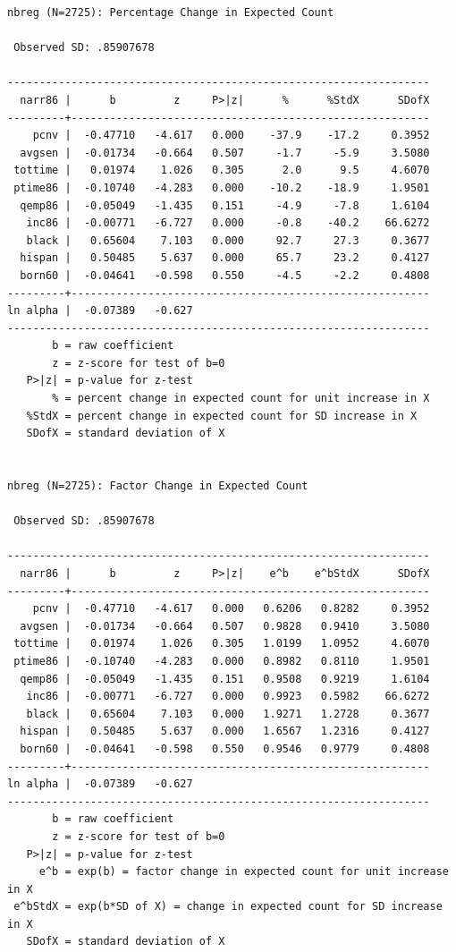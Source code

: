 \documentclass[
]{book}
\begin{document}
\begin{verbatim}
nbreg (N=2725): Percentage Change in Expected Count 

 Observed SD: .85907678

------------------------------------------------------------------
  narr86 |      b         z     P>|z|      %      %StdX      SDofX
---------+--------------------------------------------------------
    pcnv |  -0.47710   -4.617   0.000    -37.9    -17.2     0.3952
  avgsen |  -0.01734   -0.664   0.507     -1.7     -5.9     3.5080
 tottime |   0.01974    1.026   0.305      2.0      9.5     4.6070
 ptime86 |  -0.10740   -4.283   0.000    -10.2    -18.9     1.9501
  qemp86 |  -0.05049   -1.435   0.151     -4.9     -7.8     1.6104
   inc86 |  -0.00771   -6.727   0.000     -0.8    -40.2    66.6272
   black |   0.65604    7.103   0.000     92.7     27.3     0.3677
  hispan |   0.50485    5.637   0.000     65.7     23.2     0.4127
  born60 |  -0.04641   -0.598   0.550     -4.5     -2.2     0.4808
---------+--------------------------------------------------------
ln alpha |  -0.07389   -0.627
------------------------------------------------------------------
       b = raw coefficient
       z = z-score for test of b=0
   P>|z| = p-value for z-test
       % = percent change in expected count for unit increase in X
   %StdX = percent change in expected count for SD increase in X
   SDofX = standard deviation of X


nbreg (N=2725): Factor Change in Expected Count 

 Observed SD: .85907678

------------------------------------------------------------------
  narr86 |      b         z     P>|z|    e^b    e^bStdX      SDofX
---------+--------------------------------------------------------
    pcnv |  -0.47710   -4.617   0.000   0.6206   0.8282     0.3952
  avgsen |  -0.01734   -0.664   0.507   0.9828   0.9410     3.5080
 tottime |   0.01974    1.026   0.305   1.0199   1.0952     4.6070
 ptime86 |  -0.10740   -4.283   0.000   0.8982   0.8110     1.9501
  qemp86 |  -0.05049   -1.435   0.151   0.9508   0.9219     1.6104
   inc86 |  -0.00771   -6.727   0.000   0.9923   0.5982    66.6272
   black |   0.65604    7.103   0.000   1.9271   1.2728     0.3677
  hispan |   0.50485    5.637   0.000   1.6567   1.2316     0.4127
  born60 |  -0.04641   -0.598   0.550   0.9546   0.9779     0.4808
---------+--------------------------------------------------------
ln alpha |  -0.07389   -0.627
------------------------------------------------------------------
       b = raw coefficient
       z = z-score for test of b=0
   P>|z| = p-value for z-test
     e^b = exp(b) = factor change in expected count for unit increase in X
 e^bStdX = exp(b*SD of X) = change in expected count for SD increase in X
   SDofX = standard deviation of X
\end{verbatim}
\end{document}
